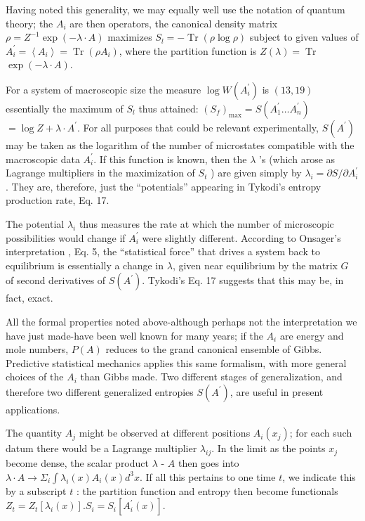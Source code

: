 \documentclass{article}
\begin{document}
Having noted this generality, we may equally well use the notation of quantum theory; the $A_i$ are then operators, the canonical density matrix $\rho=Z^{-1} \exp (-\lambda \cdot A)$ maximizes $S_l=-\operatorname{Tr}(\rho \log \rho)$ subject to given values of $A_i^{\prime}=\left\langle A_i\right\rangle=\operatorname{Tr}\left(\rho A_i\right)$, where the partition function is $Z(\lambda)=\operatorname{Tr}$ $\exp (-\lambda \cdot A)$.

For a system of macroscopic size the measure $\log W\left(A_i^{\prime}\right)$ is $(13,19)$ essentially the maximum of $S_l$ thus attained: $\left(S_f\right)_{\max }=S\left(A_1^{\prime} \ldots A_n^{\prime}\right)$ $=\log Z+\lambda \cdot A^{\prime}$. For all purposes that could be relevant experimentally, $S\left(A^{\prime}\right)$ may be taken as the logarithm of the number of microstates compatible with the macroscopic data $A_i^{\prime}$. If this function is known, then the $\lambda$ 's (which arose as Lagrange multipliers in the maximization of $S_t$ ) are given simply by $\lambda_i=\partial S / \partial A_i^{\prime}$. They are, therefore, just the ``potentials'' appearing in Tykodi's entropy production rate, Eq. 17.

The potential $\lambda_i$ thus measures the rate at which the number of microscopic possibilities would change if $A_i^{\prime}$ were slightly different. According to Onsager's interpretation \cite{onsager1931}, Eq. 5, the ``statistical force'' that drives a system back to equilibrium is essentially a change in $\lambda$, given near equilibrium by the matrix $G$ of second derivatives of $S\left(A^{\prime}\right)$. Tykodi's Eq. 17 suggests that this may be, in fact, exact.

All the formal properties noted above-although perhaps not the interpretation we have just made-have been well known for many years; if the $A_i$ are energy and mole numbers, $P(A)$ reduces to the grand canonical ensemble of Gibbs. Predictive statistical mechanics applies this same formalism, with more general choices of the $A_i$ than Gibbs made. Two different stages of generalization, and therefore two different generalized entropies $S\left(A^{\prime}\right)$, are useful in present applications.

The quantity $A_j$ might be observed at different positions $A_i\left(x_j\right)$; for each such datum there would be a Lagrange multiplier $\lambda_{i j}$. In the limit as the points $x_j$ become dense, the scalar product $\lambda$ - $A$ then goes into $\lambda \cdot A \rightarrow \Sigma_i \int \lambda_i(x) A_i(x) d^3 x$. If all this pertains to one time $t$, we indicate this by a subscript $t$ : the partition function and entropy then become functionals $Z_t=Z_t\left[\lambda_i(x)\right] . S_i=S_i\left[A_i^{\prime}(x)\right]$.
\end{document}
